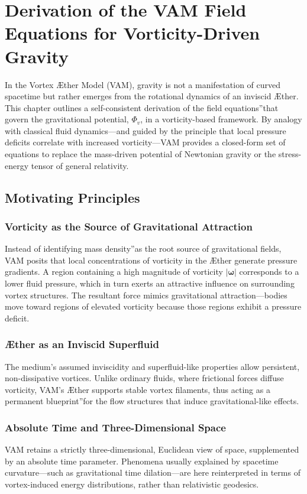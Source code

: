 \section{Derivation of the VAM Field Equations for Vorticity-Driven Gravity}
In the Vortex Æther Model (VAM), gravity is not a manifestation of curved spacetime but rather emerges from the rotational dynamics of an inviscid Æther. This chapter outlines a self-consistent derivation of the \grqq field equations\textquotedblright that govern the gravitational potential, \(\Phi_v\), in a vorticity-based framework. By analogy with classical fluid dynamics—and guided by the principle that local pressure deficits correlate with increased vorticity—VAM provides a closed-form set of equations to replace the mass-driven potential of Newtonian gravity or the stress-energy tensor of general relativity.

\subsection{Motivating Principles}
\subsubsection{Vorticity as the Source of Gravitational Attraction}
Instead of identifying \grqq mass density\textquotedblright as the root source of gravitational fields, VAM posits that local concentrations of vorticity in the Æther generate pressure gradients. A region containing a high magnitude of vorticity \(\lvert \boldsymbol{\omega} \rvert\) corresponds to a lower fluid pressure, which in turn exerts an attractive influence on surrounding vortex structures. The resultant force mimics gravitational attraction—bodies move toward regions of elevated vorticity because those regions exhibit a pressure deficit.

\subsubsection{Æther as an Inviscid Superfluid}
The medium's assumed inviscidity and superfluid-like properties allow persistent, non-dissipative vortices. Unlike ordinary fluids, where frictional forces diffuse vorticity, VAM's Æther supports stable vortex filaments, thus acting as a permanent \grqq blueprint\textquotedblright for the flow structures that induce gravitational-like effects.

\subsubsection{Absolute Time and Three-Dimensional Space}
VAM retains a strictly three-dimensional, Euclidean view of space, supplemented by an absolute time parameter. Phenomena usually explained by spacetime curvature—such as gravitational time dilation—are here reinterpreted in terms of vortex-induced energy distributions, rather than relativistic geodesics.

